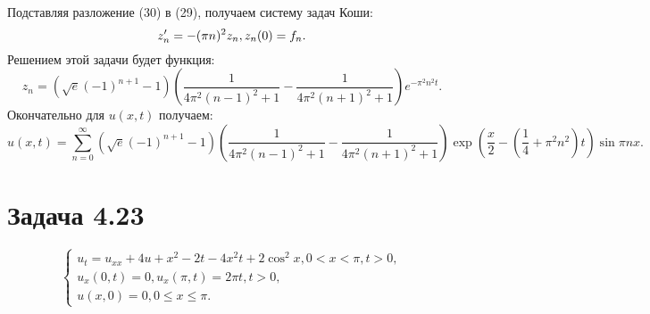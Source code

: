 \documentclass[11pt]{article}
\begin{document}
Подставляя разложение (30) в (29), получаем систему задач Коши:
\begin{equation*}
z_n' = -(\pi n)^2z_n, \\
z_n(0) = f_n.
\end{equation*}
Решением этой задачи будет функция:
\begin{equation*}
z_n = (\sqrt{e}(-1)^{n + 1} - 1)\left(\frac1{4\pi^2(n - 1)^2 + 1} - \frac1{4\pi^2(n + 1)^2 + 1}\right)e^{-\pi^2n^2t}.
\end{equation*}
Окончательно для $u(x, t)$ получаем:
\begin{equation}
u(x, t) = \sum_{n = 0}^{\infty}(\sqrt{e}(-1)^{n + 1} - 1)\left(\frac1{4\pi^2(n - 1)^2 + 1} -
\frac1{4\pi^2(n + 1)^2 + 1}\right)\exp\left(\frac{x}2 - \left(\frac14 + \pi^2n^2\right)t\right)
\sin\pi nx.
\end{equation}
\section{Задача 4.23}
\label{sec:orgb77dea1}
\begin{equation}
\begin{cases}
u_t = u_{xx} + 4u + x^2 - 2t - 4x^2t + 2\cos^2x, 0 < x < \pi, t > 0, \\
u_x(0, t) = 0, u_x(\pi, t) = 2\pi t, t > 0, \\
u(x, 0) = 0, 0 \leq x \leq \pi.
\end{cases}
\end{equation}
\end{document}
